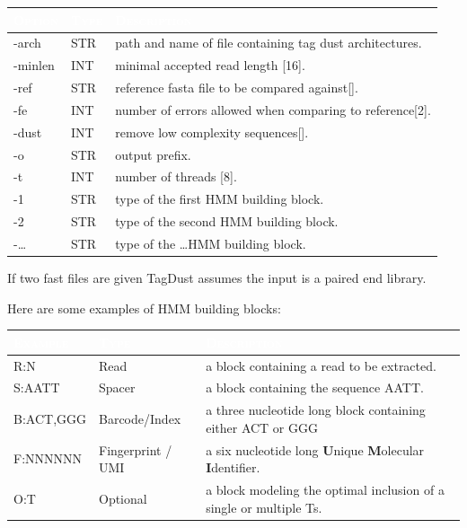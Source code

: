 \documentclass[11pt,a4paper,oneside]{book}
\begin{document}
\begin{center}
\begin{tabular}{| l | l | p{12cm}|}
\hline
\rowcolor{blue} \textcolor{white}{\scshape Option}		&\textcolor{white}{\scshape Type}		&	\textcolor{white}{\scshape Description}\\ \hline
-arch & STR & path and name of file containing tag dust architectures. \\
-minlen & INT & minimal accepted read length [16].\\
-ref     &  STR &    reference fasta file to be compared against[].\\
-fe &       INT &    number of errors allowed when comparing to reference[2].\\
-dust &	INT &	remove low complexity sequences[].\\
-o & STR & output prefix.\\
-t & INT & number of threads [8].\\
-1 & STR & type of the first HMM building block. \\
-2 & STR & type of the second HMM building block.\\
-\dots & STR & type of the \dots HMM building block.\\
\hline
\end{tabular}
\end{center}

If two fast files are given TagDust assumes the input is a paired end library.

\vspace{10 mm}


Here are some examples of HMM building blocks:
\begin{center}


\begin{tabular}{| l | l | p{12cm}|}
\hline
\rowcolor{blue} \textcolor{white}{\scshape Example}		&\textcolor{white}{\scshape Type}		&	\textcolor{white}{\scshape Description}\\ \hline
R:N & Read  & a block containing a read to be extracted.\\
S:AATT & Spacer & a block containing the sequence AATT.\\ 
B:ACT,GGG & Barcode/Index & a three nucleotide long block containing either ACT or GGG\\ 
F:NNNNNN & Fingerprint / UMI & a six nucleotide long {\bf U}nique {\bf M}olecular {\bf I}dentifier.\\ 
O:T  & Optional & a block modeling the optimal inclusion of a single or multiple Ts.\\
\hline
\end{tabular}
\end{center}
\end{document}
